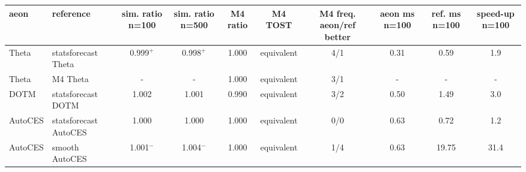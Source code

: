 \begin{tabular}{llcccccccc}
\toprule
aeon & reference & sim. ratio n=100 & sim. ratio n=500 & M4 ratio & M4 TOST & M4 freq. aeon/ref better & aeon ms n=100 & ref. ms n=100 & speed-up n=100 \\
\midrule
Theta & statsforecast Theta & 0.999$^+$ & 0.998$^+$ & 1.000 & equivalent & 4/1 & 0.31 & 0.59 & 1.9 \\
Theta & M4 Theta & - & - & 1.000 & equivalent & 3/1 & - & - & - \\
DOTM & statsforecast DOTM & 1.002 & 1.001 & 0.990 & equivalent & 3/2 & 0.50 & 1.49 & 3.0 \\
AutoCES & statsforecast AutoCES & 1.000 & 1.000 & 1.000 & equivalent & 0/0 & 0.63 & 0.72 & 1.2 \\
AutoCES & smooth AutoCES & 1.001$^-$ & 1.004$^-$ & 1.000 & equivalent & 1/4 & 0.63 & 19.75 & 31.4 \\
\bottomrule
\end{tabular}

